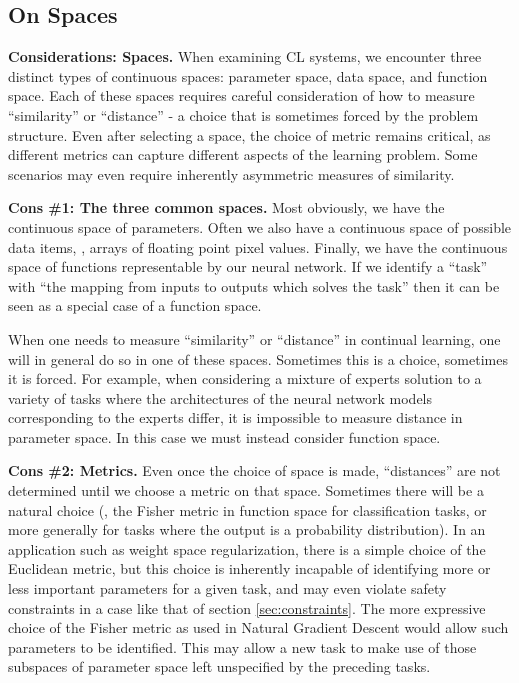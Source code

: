 \subsection{On Spaces} 
\begin{tcolorbox}[colback=orange!10,colframe=orange!50,boxsep=-1pt]
\textbf{Considerations: Spaces.}
When examining CL systems, we encounter three distinct types of continuous spaces: 
parameter space, data space, and function space. Each of these spaces requires careful consideration 
of how to measure ``similarity'' or ``distance'' - a choice that is sometimes forced by the problem 
structure. Even after selecting a space, the choice of metric remains critical, as different metrics 
can capture different aspects of the learning problem. Some scenarios may even require inherently 
asymmetric measures of similarity.
\end{tcolorbox}

\textbf{Cons \#1: The three common spaces.}
Most obviously, we have the continuous space of parameters.
Often we also have a continuous space of possible data items, \eg, arrays of floating point pixel values.
Finally, we have the continuous space of functions representable by our neural network.
If we identify a ``task'' with ``the mapping from inputs to outputs which solves the task'' then it can be seen as a special case of a function space.

When one needs to measure ``similarity'' or ``distance'' in continual learning, one will in general do so in one of these spaces.
Sometimes this is a choice, sometimes it is forced.
For example, when considering a mixture of experts solution to a variety of tasks where the architectures of the neural network models corresponding to the experts differ, it is impossible to measure distance in parameter space.
In this case we must instead consider function space.

\textbf{Cons \#2: Metrics.}
Even once the choice of space is made, ``distances'' are not determined until we choose a metric on that space.
Sometimes there will be a natural choice
(\eg, the Fisher metric in function space for classification tasks, or more generally for tasks where the output is a probability distribution).
In an application such as weight space regularization, there is a simple choice of the Euclidean metric,
but this choice is inherently incapable of identifying more or less important parameters for a given task, and may even violate safety constraints in a case like that of section \ref{sec:constraints}.
The more expressive choice of the Fisher metric as used in Natural Gradient Descent would allow such parameters to be identified.
This may allow a new task to make use of those subspaces of parameter space left unspecified by the preceding tasks.

